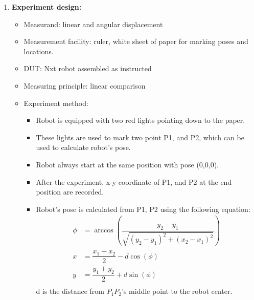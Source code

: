 \documentclass[a4paper, 12pt]{article}
\begin{document}
\begin{enumerate}
		\item \textbf{Experiment design:}
		\begin{itemize}
			\item Measurand: linear and angular displacement
			\item Measurement facility: ruler, white sheet of paper for marking poses and locations.
			\item DUT: Nxt robot assembled as instructed
			\item Measuring principle: linear comparison
			\item Experiment method:
				\begin{itemize}
					\item Robot is equipped with two red lights pointing down to the paper.
					\item These lights are used to mark two point P1, and P2, which can be used to calculate robot's pose.
					\item Robot always start at the same position with pose (0,0,0).
					\item After the experiment, x-y coordinate of P1, and P2 at the end position are recorded.
					\item Robot's pose is calculated from P1, P2 using the following equation:
					\begin{align*}
						\phi &= \arccos(\dfrac{y_2 - y_1}{\sqrt{(y_2 - y_1)^2 + (x_2 - x_1)^2}}) \\
						x &= \dfrac{x_1 + x_2}{2} - d\cos(\phi)  \\
						y &= \dfrac{y_1 + y_2}{2} + d\sin(\phi) \\
					\end{align*}
						d is the distance from $P_1P_2$'s middle point to the robot center.		
								
				\end{itemize}
			
		\end{itemize}
		

\end{enumerate}
\end{document}
